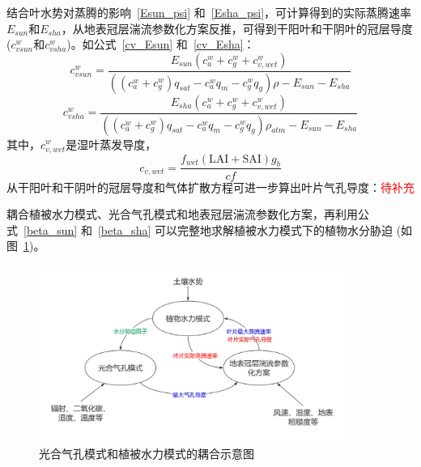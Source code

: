 结合叶水势对蒸腾的影响~\eqref{Esun_psi} 和~\eqref{Esha_psi}，可计算得到的实际蒸腾速率$E_{sun}$和$E_{sha}$，从地表冠层湍流参数化方案反推，可得到干阳叶和干阴叶的冠层导度 ($c_{vsun}^{w}$和$c_{vsha}^{w}$)。如公式~\eqref{cv_Esun} 和~\eqref{cv_Esha}：
\begin{equation}\label{cv_Esun}c_{vsun}^{w}=\frac{E_{sun}\left(c_a^w+c_g^w+c_{v,wet}^{w}\right)}{\left(\left(c_a^w+c_g^w\right)q_{sat}-c_a^w q_m - c_g^w q_g\right)\rho-E_{sun}-E_{sha}}
\end{equation}
%
\begin{equation}\label{cv_Esha}
c_{vsha}^{w}=\frac{E_{sha}\left(c_a^w+c_g^w+c_{v,wet}^{w}\right)}{\left(\left(c_a^w+c_g^w\right)q_{sat}-c_a^w q_m - c_g^w q_g\right)\rho_{atm}-E_{sun}-E_{sha}}
\end{equation}
其中，$c_{v,wet}^{w}$是湿叶蒸发导度，
\begin{equation}\label{cwet}
c_{v,wet}=\frac{f_{wet}\left(\text{LAI}+\text{SAI}\right)g_b}{cf}
\end{equation}
从干阳叶和干阴叶的冠层导度和气体扩散方程可进一步算出叶片气孔导度：\textcolor{red}{待补充}
%

耦合植被水力模式、光合气孔模式和地表冠层湍流参数化方案，再利用公式~\eqref{beta_sun} 和~\eqref{beta_sha} 可以完整地求解植被水力模式下的植物水分胁迫 (如图~\ref{fig:光合气孔模式和植被水力模式的耦合示意图})。
{
    \begin{figure}[htbp]
    \centering
    \includegraphics[width=0.9\textwidth]{Figures/植被水力模式/光合气孔模式和植被水力模式的耦合示意图.png}
    \caption{光合气孔模式和植被水力模式的耦合示意图}
    \label{fig:光合气孔模式和植被水力模式的耦合示意图}
    \end{figure}
}


